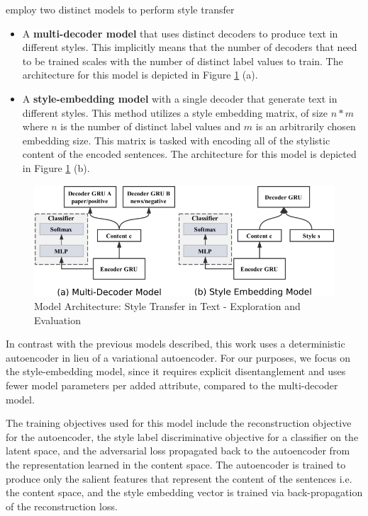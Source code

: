 \cite{fu2017style} employ two distinct models to perform style transfer
\begin{itemize}
	\item A \textbf{multi-decoder model} that uses distinct decoders to produce text in different styles. This implicitly means that the number of decoders that need to be trained scales with the number of distinct label values to train. The architecture for this model is depicted in Figure \ref{fig:semb-architecture} (a).
	\item A \textbf{style-embedding model} with a single decoder that generate text in different styles. This method utilizes a style embedding matrix, of size $n * m$ where $n$ is the number of distinct label values and $m$ is an arbitrarily chosen embedding size. This matrix is tasked with encoding all of the stylistic content of the encoded sentences. The architecture for this model is depicted in Figure \ref{fig:semb-architecture} (b).
\end{itemize}

\begin{figure}[ht]
	\centering
	\includegraphics[width=\textwidth]{images/semb-architecture}
	\caption{\label{fig:semb-architecture} Model Architecture: Style Transfer in Text - Exploration and Evaluation}
\end{figure}

In contrast with the previous models described, this work uses a deterministic autoencoder in lieu of a variational autoencoder. For our purposes, we focus on the style-embedding model, since it requires explicit disentanglement and uses fewer model parameters per added attribute, compared to the multi-decoder model.

The training objectives used for this model include the reconstruction objective for the autoencoder, the style label discriminative objective for a classifier on the latent space, and the adversarial loss propagated back to the autoencoder from the representation learned in the content space. The autoencoder is trained to produce only the salient features that represent the content of the sentences i.e. the content space, and the style embedding vector is trained via back-propagation of the reconstruction loss.

